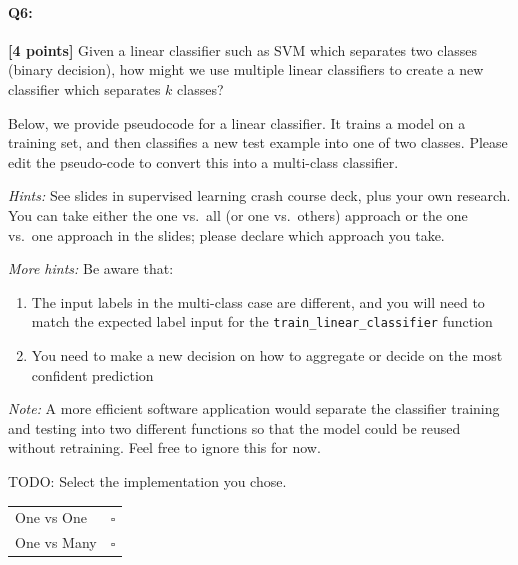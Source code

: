 
\pagebreak
\paragraph{Q6:} \textbf{[4 points]} Given a linear classifier such as SVM which separates two classes (binary decision), how might we use multiple linear classifiers to create a new classifier which separates $k$ classes?

Below, we provide pseudocode for a linear classifier. It trains a model on a training set, and then classifies a new test example into one of two classes. Please edit the pseudo-code to convert this into a multi-class classifier. 

\emph{Hints:} See slides in supervised learning crash course deck, plus your own research. You can take either the one vs.~all (or one vs.~others) approach or the one vs.~one approach in the slides; please declare which approach you take.

\emph{More hints:} Be aware that:
\begin{enumerate}
    \item The input labels in the multi-class case are different, and you will need to match the expected label input for the \texttt{train\_linear\_classifier} function
    \item You need to make a new decision on how to aggregate or decide on the most confident prediction
\end{enumerate}

\emph{Note:} A more efficient software application would separate the classifier training and testing into two different functions so that the model could be reused without retraining. Feel free to ignore this for now.


\begin{mdframed}
TODO: Select the implementation you chose.

\begin{tabular}[h]{lc}
\bottomrule
One vs One & $\square$ \\
One vs Many & $\square$ \\
\toprule
\end{tabular}
\end{mdframed}

